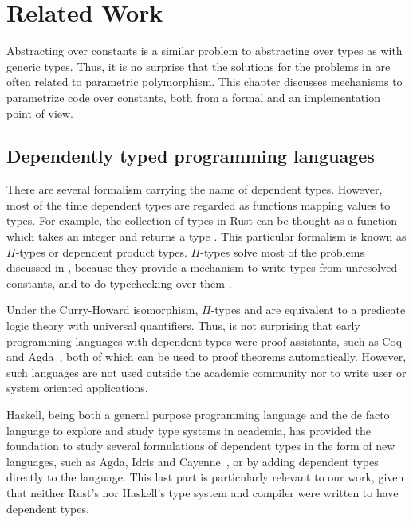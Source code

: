 \newcommand{\pdtn}[1] { \langle \text{#1} \rangle }

\chapter{Related Work}

\label{chap:related_work}

Abstracting over constants is a similar problem to abstracting over types as
with generic types. Thus, it is no surprise that the solutions for the problems in
 are often related to parametric polymorphism. This
chapter discusses mechanisms to parametrize code over constants, both from a
formal and an implementation point of view.

\section{Dependently typed programming languages}

There are several formalism carrying the name of dependent types. However, most
of the time dependent types are regarded as functions mapping values to types.
For example, the collection of types \inrust{[N; i32]} in Rust can be thought
as a function which takes an integer  and returns a type \inrust{[N;
i32]}. This particular formalism is known as $\Pi$-types or dependent product
types. $\Pi$-types solve most of the problems discussed in
, because they provide a mechanism to write types from
unresolved constants, and to do typechecking over them \cite{pierce}.

Under the Curry-Howard isomorphism, $\Pi$-types and are equivalent to a
predicate logic theory with universal quantifiers. Thus, is not surprising that
early programming languages with dependent types were proof assistants, such as
Coq and Agda~\cite{agda}, both of which can be used to proof theorems
automatically.  However, such languages are not used outside the academic
community nor to write user or system oriented applications.

Haskell, being both a general purpose programming language and the de facto
language to explore and study type systems in academia, has provided the
foundation to study several formulations of dependent types in the form of new
languages, such as Agda, Idris \cite{idris} and Cayenne~\cite{cayenne}, or by
adding dependent types directly to the language. This last part is particularly
relevant to our work, given that neither Rust's nor Haskell's type system and
compiler were written to have dependent types.

